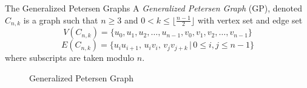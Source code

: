 \documentclass[final]{beamer}
\def\red{\color{red}}
\newcommand{\mr}{\operatorname{mr}}
\newcommand{\M}{\operatorname{M}}
\newcommand{\Z}{\operatorname{Z}}
\newcommand{\eit}{\end{itemize}}
\begin{document}
\begin{frame}{}
\begin{columns}[t]
\begin{column}{0.38\linewidth}

\begin{block}{\red\Huge The Generalized Petersen Graphs}
A {\color{blue}\emph{Generalized Petersen Graph}} (GP), denoted $C_{n,k}$
is a graph such that 
$n \geq 3$ and $0 < k \leq \lfloor \frac{n-1}{2} \rfloor$
with vertex set and edge set
\[
V(C_{n,k}) = \{u_0, u_1, u_2, \ldots, u_{n-1}, v_0, v_1,
v_2, \ldots,
v_{n-1} \}
\] 
\[
E(C_{n,k}) = \{u_iu_{i+1},\, u_iv_i,\, v_jv_{j+k} \, |\, 0 \leq
i,j
\leq n-1\}
\] where subscripts are taken modulo $n$.
\begin{figure}[h!] 
\centering
{}
\caption{Generalized Petersen Graph}
\end{figure}


\end{block}


\end{column}
\end{columns}
\end{frame}
\end{document}
